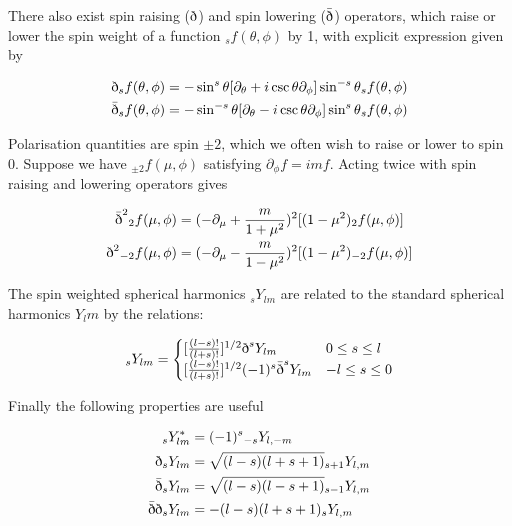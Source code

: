 \documentclass[a4paper,10pt]{article}
\newcommand{\sr}{\text{\normalfont\dh}}
\renewcommand{\sl}{\bar{\text{\normalfont\dh}}}
\begin{document}
There also exist spin raising ($\sr$) and spin lowering ($\sl$) operators, which raise or lower the spin weight of a function $_sf(\theta,\phi)$ by 1, with explicit expression given by

\begin{equation}\begin{split}
\sr {}_sf(\theta, \phi) &= -\sin^s{\theta}[\partial_\theta+i\csc{\theta}\partial_\phi]\sin^{-s}{\theta}{}_sf(\theta, \phi)\\
\sl {}_sf(\theta, \phi) &= -\sin^{-s}{\theta}[\partial_\theta-i\csc{\theta}\partial_\phi]\sin^{s}{\theta}{}_sf(\theta, \phi)
\label{explicitspinraiselower}
\end{split}\end{equation}

Polarisation quantities are spin $\pm 2$, which we often wish to raise or lower to spin 0. Suppose we have ${}_{\pm2}f(\mu,\phi)$ satisfying $\partial_\phi{}f=imf$. Acting twice with spin raising and lowering operators gives

\begin{equation}\begin{split}
\sl^2{}_2f(\mu, \phi) &= (-\partial_\mu+\frac{m}{1+\mu^2})^2[(1-\mu^2)_2f(\mu,\phi)]\\
\sr^2{}_{-2}f(\mu, \phi) &= (-\partial_\mu-\frac{m}{1-\mu^2})^2[(1-\mu^2)_{-2}f(\mu,\phi)]
\label{+-2}
\end{split}\end{equation}

The spin weighted spherical harmonics $_sY_{lm}$ are related to the standard spherical harmonics $Y_lm$ by the relations:

\begin{equation}
_sY_{lm} = 
\begin{cases}
[\frac{(l-s)!}{(l+s)!}]^{1/2}\sr^s Y_{lm} & 0\leq s\leq l\\
[\frac{(l-s)!}{(l+s)!}]^{1/2}(-1)^s\sl^s Y_{lm} & -l\leq s\leq 0
\end{cases}
\end{equation}

Finally the following properties are useful

\begin{equation}\begin{split}
{}_sY_{lm}^* &= (-1)^s {}_{-s}Y_{l,-m}\\
\sr {}_sY_{lm} &= \sqrt{(l-s)(l+s+1)}{}_{s+1}Y_{l,m}\\
\sl {}_sY_{lm} &= \sqrt{(l-s)(l-s+1)}{}_{s-1}Y_{l,m}\\
\sl\sr {}_sY_{lm} &= -(l-s)(l+s+1){}_{s}Y_{l,m}
\label{propertiesofspin}
\end{split}\end{equation}
\end{document}
